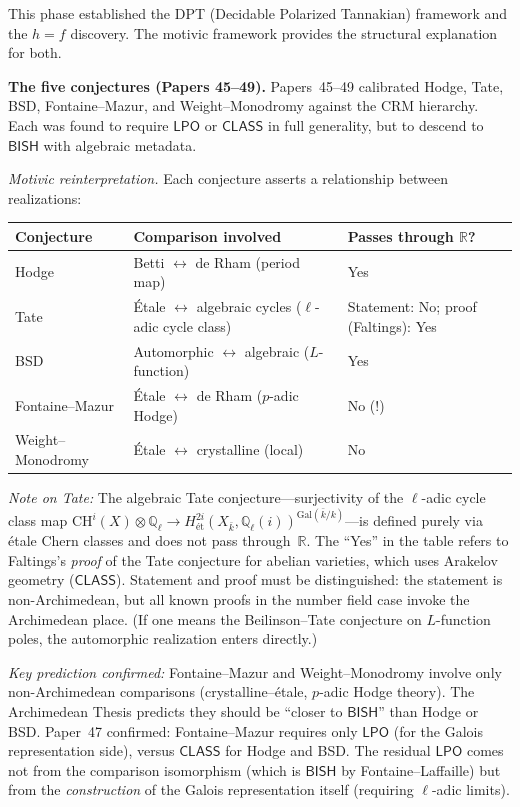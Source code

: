 \documentclass[11pt,a4paper]{article}
\theoremstyle{plain}
\theoremstyle{definition}
\newcommand{\BISH}{\textsf{BISH}}
\newcommand{\LPO}{\textsf{LPO}}
\newcommand{\CLASS}{\textsf{CLASS}}
\newcommand{\Q}{\mathbb{Q}}
\newcommand{\R}{\mathbb{R}}
\begin{document}
This phase established the DPT (Decidable Polarized Tannakian) framework and the $h = f$ discovery. The motivic framework provides the structural explanation for both.

\medskip
\noindent\textbf{The five conjectures (Papers 45--49).} Papers~45--49 calibrated Hodge, Tate, BSD, Fontaine--Mazur, and Weight--Monodromy against the CRM hierarchy. Each was found to require $\LPO$ or $\CLASS$ in full generality, but to descend to $\BISH$ with algebraic metadata.

\emph{Motivic reinterpretation.} Each conjecture asserts a relationship between realizations:
\begin{center}
\begin{tabular}{@{}lll@{}}
\toprule
\textbf{Conjecture} & \textbf{Comparison involved} & \textbf{Passes through $\R$?} \\
\midrule
Hodge & Betti $\leftrightarrow$ de Rham (period map) & Yes \\
Tate & \'Etale $\leftrightarrow$ algebraic cycles ($\ell$-adic cycle class) & Statement: No; proof (Faltings): Yes \\
BSD & Automorphic $\leftrightarrow$ algebraic ($L$-function) & Yes \\
Fontaine--Mazur & \'Etale $\leftrightarrow$ de Rham ($p$-adic Hodge) & No (!) \\
Weight--Monodromy & \'Etale $\leftrightarrow$ crystalline (local) & No \\
\bottomrule
\end{tabular}
\end{center}

\emph{Note on Tate:} The algebraic Tate conjecture---surjectivity of the $\ell$-adic cycle class map $\mathrm{CH}^i(X) \otimes \Q_\ell \to H^{2i}_{\text{\'et}}(X_{\bar{k}}, \Q_\ell(i))^{\mathrm{Gal}(\bar{k}/k)}$---is defined purely via \'etale Chern classes and does not pass through~$\R$. The ``Yes'' in the table refers to Faltings's \emph{proof} of the Tate conjecture for abelian varieties, which uses Arakelov geometry ($\CLASS$). Statement and proof must be distinguished: the statement is non-Archimedean, but all known proofs in the number field case invoke the Archimedean place. (If one means the Beilinson--Tate conjecture on $L$-function poles, the automorphic realization enters directly.)

\emph{Key prediction confirmed:} Fontaine--Mazur and Weight--Monodromy involve only non-Archimedean comparisons (crystalline--\'etale, $p$-adic Hodge theory). The Archimedean Thesis predicts they should be ``closer to $\BISH$'' than Hodge or BSD. Paper~47 confirmed: Fontaine--Mazur requires only $\LPO$ (for the Galois representation side), versus $\CLASS$ for Hodge and BSD. The residual $\LPO$ comes not from the comparison isomorphism (which is $\BISH$ by Fontaine--Laffaille) but from the \emph{construction} of the Galois representation itself (requiring $\ell$-adic limits).
\end{document}
